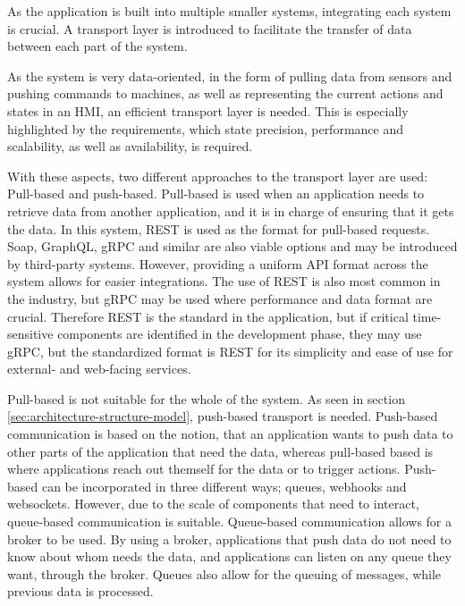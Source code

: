 
As the application is built into multiple smaller systems, integrating each system is crucial. A transport layer is introduced to facilitate the transfer of data between each part of the system. 

As the system is very data-oriented, in the form of pulling data from sensors and pushing commands to machines, as well as representing the current actions and states in an HMI, an efficient transport layer is needed. This is especially highlighted by the requirements, which state precision, performance and scalability, as well as availability, is required.

With these aspects, two different approaches to the transport layer are used: Pull-based and push-based.
Pull-based is used when an application needs to retrieve data from another application, and it is in charge of ensuring that it gets the data.
In this system, REST is used as the format for pull-based requests. Soap, GraphQL, gRPC and similar are also viable options and may be introduced by third-party systems. However, providing a uniform API format across the system allows for easier integrations. The use of REST is also most common in the industry, but gRPC may be used where performance and data format are crucial. Therefore REST is the standard in the application, but if critical time-sensitive components are identified in the development phase, they may use gRPC, but the standardized format is REST for its simplicity and ease of use for external- and web-facing services.

Pull-based is not suitable for the whole of the system. As seen in section \ref{sec:architecture-structure-model}, push-based transport is needed.
Push-based communication is based on the notion, that an application wants to push data to other parts of the application that need the data, whereas pull-based based is where applications reach out themself for the data or to trigger actions.
Push-based can be incorporated in three different ways; queues, webhooks and websockets.
However, due to the scale of components that need to interact, queue-based communication is suitable. Queue-based communication allows for a broker to be used. By using a broker, applications that push data do not need to know about whom needs the data, and applications can listen on any queue they want, through the broker. 
Queues also allow for the queuing of messages, while previous data is processed.

